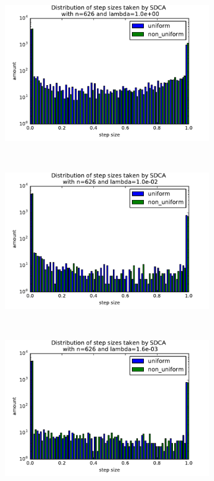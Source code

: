 \documentclass{article}
\DeclareMathOperator{\1}{\mathbb{1}}
\begin{document}
\begin{figure}[ht]
    \centering
    \begin{subfigure}[t]{0.3\textwidth}
        \centering
        \includegraphics[width=\textwidth]{images/20170914_040255_ocr_stepdistrib.pdf}
    \end{subfigure}
    ~
    \begin{subfigure}[t]{0.3\textwidth}
        \centering
        \includegraphics[width=\textwidth]{images/20170914_041649_ocr_stepdistrib.pdf}
    \end{subfigure}
    ~
    \begin{subfigure}[t]{0.3\textwidth}
        \centering
        \includegraphics[width=\textwidth]{images/20170914_040720_ocr_stepdistrib.pdf}

\end{subfigure}
\end{figure}
\end{document}
